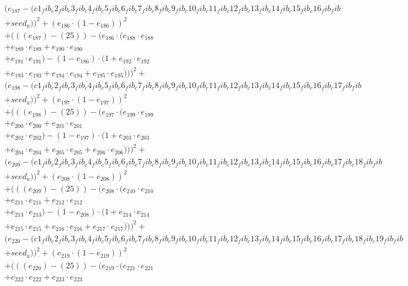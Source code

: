 \documentclass[10pt, a4paper]{article}
\begin{document}
\begin{small}
\begin{align*}
& (e_{187} - (c1_fib_c2_fib_c3_fib_c4_fib_c5_fib_c6_fib_c7_fib_c8_fib_c9_fib_c10_fib_c11_fib_c12_fib_c13_fib_c14_fib_c15_fib_c16_fib_fib \\
& + seed_a))^{2} + (e_{186} \cdot (1 - e_{186}))^{2} \\
& + (((e_{187}) - (25)) - (e_{186} \cdot (e_{188} \cdot e_{188} \\
& + e_{189} \cdot e_{189} + e_{190} \cdot e_{190} \\
& + e_{191} \cdot e_{191}) - (1 - e_{186}) \cdot (1 + e_{192} \cdot e_{192} \\
& + e_{193} \cdot e_{193} + e_{194} \cdot e_{194} + e_{195} \cdot e_{195})))^{2} + \\
& (e_{198} - (c1_fib_c2_fib_c3_fib_c4_fib_c5_fib_c6_fib_c7_fib_c8_fib_c9_fib_c10_fib_c11_fib_c12_fib_c13_fib_c14_fib_c15_fib_c16_fib_c17_fib_fib \\
& + seed_a))^{2} + (e_{197} \cdot (1 - e_{197}))^{2} \\
& + (((e_{198}) - (25)) - (e_{197} \cdot (e_{199} \cdot e_{199} \\
& + e_{200} \cdot e_{200} + e_{201} \cdot e_{201} \\
& + e_{202} \cdot e_{202}) - (1 - e_{197}) \cdot (1 + e_{203} \cdot e_{203} \\
& + e_{204} \cdot e_{204} + e_{205} \cdot e_{205} + e_{206} \cdot e_{206})))^{2} + \\
& (e_{209} - (c1_fib_c2_fib_c3_fib_c4_fib_c5_fib_c6_fib_c7_fib_c8_fib_c9_fib_c10_fib_c11_fib_c12_fib_c13_fib_c14_fib_c15_fib_c16_fib_c17_fib_c18_fib_fib \\
& + seed_a))^{2} + (e_{208} \cdot (1 - e_{208}))^{2} \\
& + (((e_{209}) - (25)) - (e_{208} \cdot (e_{210} \cdot e_{210} \\
& + e_{211} \cdot e_{211} + e_{212} \cdot e_{212} \\
& + e_{213} \cdot e_{213}) - (1 - e_{208}) \cdot (1 + e_{214} \cdot e_{214} \\
& + e_{215} \cdot e_{215} + e_{216} \cdot e_{216} + e_{217} \cdot e_{217})))^{2} + \\
& (e_{220} - (c1_fib_c2_fib_c3_fib_c4_fib_c5_fib_c6_fib_c7_fib_c8_fib_c9_fib_c10_fib_c11_fib_c12_fib_c13_fib_c14_fib_c15_fib_c16_fib_c17_fib_c18_fib_c19_fib_fib \\
& + seed_a))^{2} + (e_{219} \cdot (1 - e_{219}))^{2} \\
& + (((e_{220}) - (25)) - (e_{219} \cdot (e_{221} \cdot e_{221} \\
& + e_{222} \cdot e_{222} + e_{223} \cdot e_{223} \\

\end{align*}
\end{small}
\end{document}
